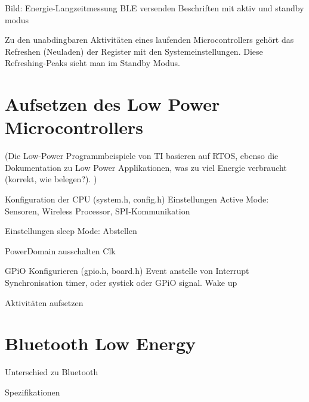 Bild: Energie-Langzeitmessung BLE versenden
Beschriften mit aktiv und standby modus

Zu den unabdingbaren Aktivitäten eines laufenden Microcontrollers gehört das Refreshen (Neuladen) der Register mit den Systemeinstellungen. Diese Refreshing-Peaks sieht man im Standby Modus.



\section{Aufsetzen des Low Power Microcontrollers}
(Die Low-Power Programmbeispiele von TI basieren auf RTOS, ebenso die Dokumentation zu Low Power Applikationen, was zu viel Energie verbraucht (korrekt, wie belegen?). )

Konfiguration der CPU (system.h, config.h)
Einstellungen Active Mode: Sensoren, Wireless Processor, SPI-Kommunikation

Einstellungen sleep Mode: Abstellen

PowerDomain ausschalten
Clk

GPiO Konfigurieren (gpio.h, board.h)
Event anstelle von Interrupt
Synchronisation
timer, oder systick oder GPiO signal. Wake up

Aktivitäten aufsetzen







\section{Bluetooth Low Energy}

Unterschied zu Bluetooth

Spezifikationen





